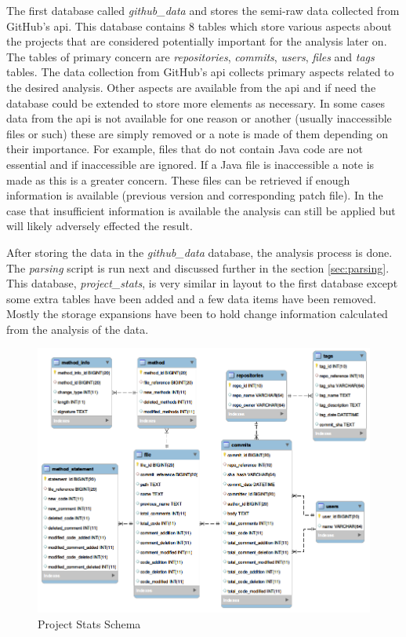 The first database called \textit{github\_data} and stores the semi-raw data collected from GitHub's \gls{api}. This database contains 8 tables which store various aspects about the projects that are considered potentially important for the analysis later on. The tables of primary concern are \textit{repositories}, \textit{commits}, \textit{users}, \textit{files} and \textit{tags} tables. The data collection from GitHub's \gls{api} collects primary aspects related to the desired analysis. Other aspects are available from the \gls{api} and if need the database could be extended to store more elements as necessary. In some cases data from the \gls{api} is not available for one reason or another (usually inaccessible files or such) these are simply removed or a note is made of them depending on their importance. For example, files that do not contain Java code are not essential and if inaccessible are ignored. If a Java file is inaccessible a note is made as this is a greater concern. These files can be retrieved if enough information is available (previous version and corresponding patch file). In the case that insufficient information is available the analysis can still be applied but will likely adversely effected the result.

After storing the data in the \textit{github\_data} database, the analysis process is done. The \textit{parsing} script is run next and discussed further in the section \ref{sec:parsing}. This database, \textit{project\_stats}, is very similar in layout to the first database except some extra tables have been added and a few data items have been removed. Mostly the storage expansions have been to hold change information calculated from the analysis of the data.

\begin{figure}[!ht]
    \centering
        \includegraphics[width=1.0\textwidth]{images/project_stats_schema}
    \caption{Project Stats Schema}
    \label{fig:project_stats_schema}
\end{figure}

